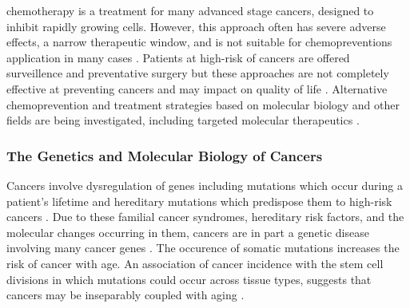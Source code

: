 \Gls{chemotherapy} is a treatment for many advanced stage cancers, designed to inhibit rapidly growing cells. However, this approach often has severe adverse effects, a narrow therapeutic window, and is not suitable for \glspl{chemoprevention} application in many cases \citep{Kaelin2009}. Patients at high-risk of cancers are offered surveillence and preventative surgery but these approaches are not completely effective at preventing cancers and may impact on quality of life \citep{Guilford2010}. Alternative \gls{chemoprevention} and treatment strategies based on molecular biology and other fields are being investigated, including targeted molecular therapeutics \citep{Bozovic-Spasojevic2012}. %



\subsubsection{The Genetics and Molecular Biology of Cancers}

Cancers involve dysregulation of genes including \glspl{mutation} which occur during a patient's lifetime and \gls{hereditary} \glspl{mutation} which predispose them to high-risk cancers \citep{NCI2015, ACS2017, Guilford1998}. Due to these \gls{familial} cancer syndromes, \gls{hereditary} risk factors, and the molecular changes occurring in them, \glspl{cancer} are in part a genetic disease involving many \glspl{cancer gene} \citep{Stratton2009, Vogelstein2013}. %
The occurence of \gls{somatic} \glspl{mutation} increases the risk of \gls{cancer} with age. An association of cancer incidence with the stem cell divisions in which \glspl{mutation} could occur across tissue types, suggests that cancers may be inseparably coupled with aging \citep{Tomasetti2015}.  


